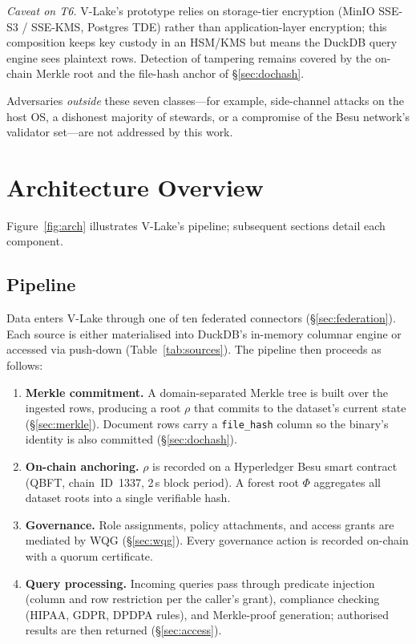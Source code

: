 \documentclass[10pt,twocolumn]{article}
\begin{document}
\emph{Caveat on T6.} V-Lake's prototype relies on storage-tier
encryption (MinIO SSE-S3 / SSE-KMS, Postgres TDE) rather than
application-layer encryption; this composition keeps key custody
in an HSM/KMS but means the DuckDB query engine sees plaintext
rows. Detection of tampering remains covered by the on-chain
Merkle root and the file-hash anchor of \S\ref{sec:dochash}.

Adversaries \emph{outside} these seven classes---for example,
side-channel attacks on the host OS, a dishonest majority of
stewards, or a compromise of the Besu network's validator set---are
not addressed by this work.


\section{Architecture Overview}
\label{sec:arch}

Figure~\ref{fig:arch} illustrates V-Lake's pipeline; subsequent
sections detail each component.

\subsection{Pipeline}

Data enters V-Lake through one of ten federated connectors
(\S\ref{sec:federation}). Each source is either materialised into
DuckDB's in-memory columnar engine or accessed via push-down
(Table~\ref{tab:sources}). The pipeline then proceeds as follows:

\begin{enumerate}[leftmargin=*,topsep=3pt,itemsep=2pt]
\item \textbf{Merkle commitment.}
  A domain-separated Merkle tree is built over the ingested rows,
  producing a root $\rho$ that commits to the dataset's current
  state (\S\ref{sec:merkle}). Document rows carry a
  \texttt{file\_hash} column so the binary's identity is also
  committed (\S\ref{sec:dochash}).

\item \textbf{On-chain anchoring.}
  $\rho$ is recorded on a Hyperledger Besu smart contract (QBFT,
  chain~ID~1337, 2\,s block period). A forest root $\Phi$
  aggregates all dataset roots into a single verifiable hash.

\item \textbf{Governance.}
  Role assignments, policy attachments, and access grants are
  mediated by WQG (\S\ref{sec:wqg}). Every governance action is
  recorded on-chain with a quorum certificate.

\item \textbf{Query processing.}
  Incoming queries pass through predicate injection (column and row
  restriction per the caller's grant), compliance checking (HIPAA,
  GDPR, DPDPA rules), and Merkle-proof generation; authorised
  results are then returned (\S\ref{sec:access}).
\end{enumerate}
\end{document}
